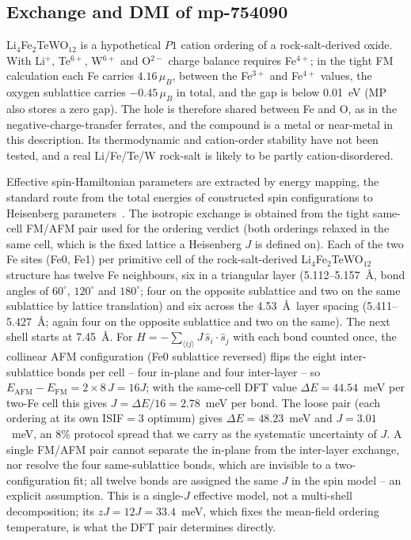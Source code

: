 \documentclass[aps,prb,preprint,superscriptaddress,longbibliography,nofootinbib]{revtex4-2}
\begin{document}
\subsection*{Exchange and DMI of mp-754090}

Li$_4$Fe$_2$TeWO$_{12}$ is a hypothetical $P1$ cation ordering of a rock-salt-derived oxide. With Li$^+$,
Te$^{6+}$, W$^{6+}$ and O$^{2-}$ charge balance requires Fe$^{4+}$; in the tight FM calculation each Fe carries
$4.16\,\mu_B$, between the Fe$^{3+}$ and Fe$^{4+}$ values, the oxygen sublattice carries $-0.45\,\mu_B$ in total,
and the gap is below 0.01~eV (MP also stores a zero gap). The hole is therefore shared between Fe and O, as in
the negative-charge-transfer ferrates, and the compound is a metal or near-metal in this description. Its
thermodynamic and cation-order stability have not been tested, and a real Li/Fe/Te/W rock-salt is likely to be
partly cation-disordered.

Effective spin-Hamiltonian parameters are extracted by energy mapping, the standard route from the total
energies of constructed spin configurations to Heisenberg
parameters~\cite{liechtenstein1987,xiang2011,xiang2013}. The isotropic exchange is obtained from the tight
same-cell FM/AFM pair used for the ordering verdict (both orderings relaxed in the same cell, which is the
fixed lattice a Heisenberg $J$ is defined on). Each of the two Fe sites (Fe0, Fe1) per primitive cell of the
rock-salt-derived Li$_4$Fe$_2$TeWO$_{12}$ structure has twelve Fe neighbours, six in a triangular layer
(5.112--5.157~\AA, bond angles of $60^\circ$, $120^\circ$ and $180^\circ$; four on the opposite sublattice and
two on the same sublattice by lattice translation) and six across the 4.53~\AA\ layer spacing
(5.411--5.427~\AA; again four on the opposite sublattice and two on the same). The next shell starts at
7.45~\AA. For $H=-\sum_{\langle ij\rangle} J\,\hat{s}_i\!\cdot\!\hat{s}_j$ with each bond counted once, the
collinear AFM configuration (Fe0 sublattice reversed) flips the eight inter-sublattice bonds per cell -- four
in-plane and four inter-layer -- so $E_\mathrm{AFM}-E_\mathrm{FM} = 2\times8\,J = 16J$; with the same-cell DFT
value $\Delta E = 44.54$~meV per two-Fe cell this gives $J = \Delta E/16 = 2.78$~meV per bond. The loose pair
(each ordering at its own ISIF$=3$ optimum) gives $\Delta E = 48.23$~meV and $J=3.01$~meV, an 8\% protocol
spread that we carry as the systematic uncertainty of $J$. A single FM/AFM pair cannot separate the in-plane
from the inter-layer exchange, nor resolve the four same-sublattice bonds, which are invisible to a
two-configuration fit; all twelve bonds are assigned the same $J$ in the spin model -- an explicit
assumption. This is a single-$J$ effective model, not a multi-shell decomposition; its $zJ = 12J = 33.4$~meV,
which fixes the mean-field ordering temperature, is what the DFT pair determines directly.
\end{document}
